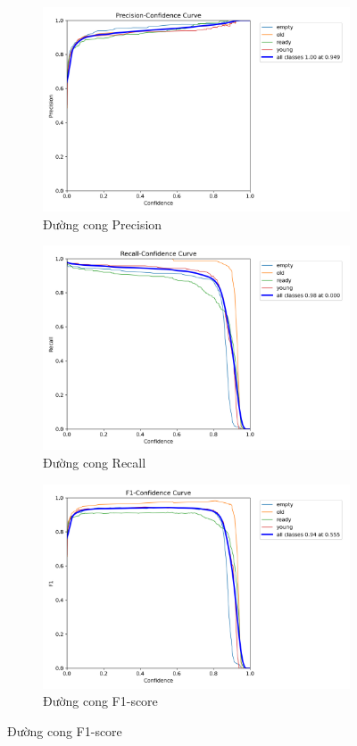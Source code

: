 \begin{figure}[H]
    \centering
    \begin{subfigure}{.5\textwidth}
        \includegraphics[width=0.95\linewidth]{images/P_curve.png}
    \caption{Đường cong Precision}
    \label{fig:training-result-p}

    \end{subfigure}%
    \begin{subfigure}{.5\textwidth}
        \includegraphics[width=0.95\linewidth]{images/R_curve.png}
    \caption{Đường cong Recall}
    \label{fig:training-result-r}
    \end{subfigure}
    \begin{subfigure}{.5\textwidth}
        \includegraphics[width=0.95\linewidth]{images/F1_curve.png}
    \caption{Đường cong F1-score}
    \label{fig:training-result-f1}


\end{subfigure}
\end{figure}
